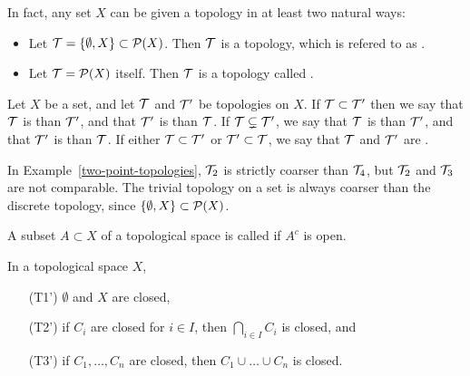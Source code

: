 \begin{example}
  In fact, any set $X$ can be given a topology in at least two natural ways:
  \begin{itemize}
    \item Let $\mathcal{T} = \{ \emptyset, X \} \subset \mathcal{P}(X)$. Then $\mathcal{T}$ is a topology, which is refered to as .
    \item Let $\mathcal{T} = \mathcal{P}(X)$ itself. Then $\mathcal{T}$ is a topology called .
  \end{itemize}
\end{example}
\begin{defn}
  Let $X$ be a set, and let $\mathcal{T}$ and $\mathcal{T}'$ be topologies on $X$. If $\mathcal{T} \subset \mathcal{T}'$ then we say that $\mathcal{T}$ is  than $\mathcal{T}'$, and that $\mathcal{T}'$ is  than $\mathcal{T}$. If $\mathcal{T} \subsetneq \mathcal{T}'$, we say that $\mathcal{T}$ is  than $\mathcal{T}'$, and that $\mathcal{T}'$ is  than $\mathcal{T}$. If either $\mathcal{T} \subset \mathcal{T}'$ or $\mathcal{T}' \subset \mathcal{T}$, we say that $\mathcal{T}$ and $\mathcal{T}'$ are .
\end{defn}
\begin{example}
  In Example~\ref{two-point-topologies}, $\mathcal{T}_2$ is strictly coarser than $\mathcal{T}_4$, but $\mathcal{T}_2$ and $\mathcal{T}_3$ are not comparable. The trivial topology on a set is always coarser than the discrete topology, since $\{\emptyset,X \} \subset \mathcal{P}(X)$.
\end{example}

\begin{defn}
  A subset $A \subset X$ of a topological space is called  if $A^c$ is open.
\end{defn}
\begin{prop}
  \label{prop-closed}
  In a topological space $X$,
  \begin{enumerate}
    \item[(T1')] $\emptyset$ and $X$ are closed,
    \item[(T2')] if $C_i$ are closed for $i \in I$, then $\bigcap_{i\in I} C_i$ is closed, and
    \item[(T3')] if $C_1, \dots, C_n$ are closed, then $C_1 \cup \dots \cup C_n$ is closed.
  \end{enumerate}
\end{prop}

